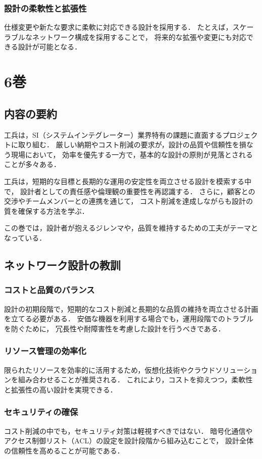 \documentclass[titlepage,a4paper]{jsarticle}
\begin{document}
\subsubsection{設計の柔軟性と拡張性}
仕様変更や新たな要求に柔軟に対応できる設計を採用する．
たとえば，スケーラブルなネットワーク構成を採用することで，
将来的な拡張や変更にも対応できる設計が可能となる．
\newpage
\section{6巻}
\subsection{内容の要約}
工兵は，SI（システムインテグレーター）業界特有の課題に直面するプロジェクトに取り組む．
厳しい納期やコスト削減の要求が，設計の品質や信頼性を損なう現場において，
効率を優先する一方で，基本的な設計の原則が見落とされることが多々ある．

工兵は，短期的な目標と長期的な運用の安定性を両立させる設計を模索する中で，
設計者としての責任感や倫理観の重要性を再認識する．
さらに，顧客との交渉やチームメンバーとの連携を通じて，
コスト削減を達成しながらも設計の質を確保する方法を学ぶ．

この巻では，設計者が抱えるジレンマや，品質を維持するための工夫がテーマとなっている．

\subsection{ネットワーク設計の教訓}
\subsubsection{コストと品質のバランス}
設計の初期段階で，短期的なコスト削減と長期的な品質の維持を両立させる計画を立てる必要がある．
安価な機器を利用する場合でも，運用段階でのトラブルを防ぐために，
冗長性や耐障害性を考慮した設計を行うべきである．

\subsubsection{リソース管理の効率化}
限られたリソースを効率的に活用するため，仮想化技術やクラウドソリューションを組み合わせることが推奨される．
これにより，コストを抑えつつ，柔軟性と拡張性の高い設計を実現できる．

\subsubsection{セキュリティの確保}
コスト削減の中でも，セキュリティ対策は軽視すべきではない．
暗号化通信やアクセス制御リスト（ACL）の設定を設計段階から組み込むことで，
設計全体の信頼性を高めることが可能である．
\end{document}
